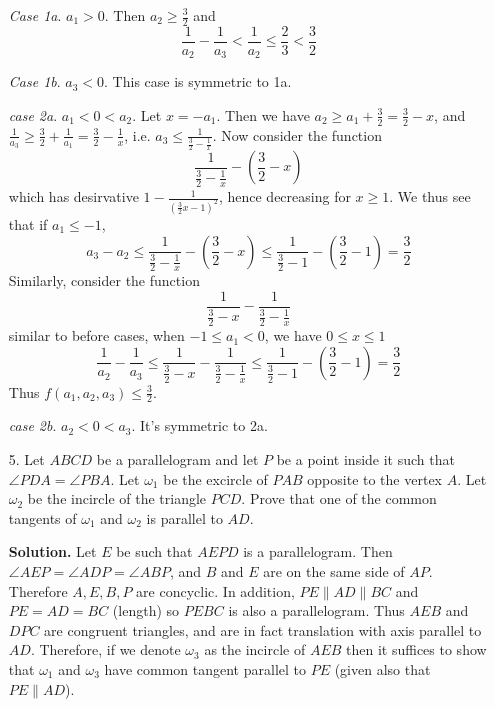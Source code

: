 \documentclass[11pt,a4paper]{article}
\begin{document}
\begin{enumerate}
	\emph{Case 1a}. $a_1> 0$. 
	Then $a_2\ge \frac 32$ and 
	\[
	\frac{1}{a_2}-\frac{1}{a_3}< \frac{1}{a_2} \le \frac{2}{3}<\frac 32
	\]
	
	\emph{Case 1b}. $a_3< 0$. 
	This case is symmetric to 1a. 
	
	\emph{case 2a}. $a_1<0<a_2$. 
	Let $x=-a_1$. 
	Then we have $a_2\ge a_1+\frac 32 = \frac 32 - x$, 
	and $\frac{1}{a_3}\ge \frac 32 +\frac{1}{a_1}=\frac 32-\frac 1x$, i.e. 
	$a_3\le \frac{1}{\frac 32-\frac 1x}$. 
	Now consider the function 
	\[
	\frac{1}{\frac 32-\frac 1x} - (\frac 32 - x)
	\]
	which has desirvative $1-\frac{1}{(\frac 32x-1)^2}$, hence decreasing for $x\ge 1$. 
	We thus see that if $a_1\le -1$, 
	\[
	a_3-a_2\le \frac{1}{\frac 32-\frac 1x} - (\frac 32 - x)\le 
	\frac{1}{\frac 32-1} - (\frac 32 - 1) = \frac 32
	\] 
	Similarly, consider the function 
	\[
	\frac{1}{\frac 32 - x} - \frac{1}{\frac 32- \frac{1}{x}}
	\]
	similar to before cases, when $-1\le a_1<0$, we have $0\le x\le 1$
	\[
	\frac{1}{a_2}-\frac{1}{a_3}
	\le \frac{1}{\frac 32 - x} - \frac{1}{\frac 32- \frac{1}{x}}
	\le \frac{1}{\frac 32-1} - (\frac 32 - 1) = \frac 32
	\]
	Thus $f(a_1, a_2, a_3)\le \frac 32$. 
	
	\emph{case 2b}. $a_2<0<a_3$. It's symmetric to 2a. 
	
	\item[5.]
	Let $ABCD$ be a parallelogram and let $P$ be a point inside it such that $\angle P DA = \angle P BA$.
	Let $\omega_1$ be the excircle of $P AB$ opposite to the vertex $A$. Let $\omega_2$ be the incircle of the
	triangle $PCD$. Prove that one of the common tangents of $\omega_1$ and $\omega_2$ is parallel to $AD$.
	
	\textbf{Solution.} 
	Let $E$ be such that $AEPD$ is a parallelogram. 
	Then $\angle AEP=\angle ADP=\angle ABP$, and $B$ and $E$ are on the same side of $AP$. 
	Therefore $A, E, B, P$ are concyclic. 
	In addition, $PE\parallel AD\parallel BC$ and $PE=AD=BC$ (length) so $PEBC$ is also a parallelogram. 
	Thus $AEB$ and $DPC$ are congruent triangles, 
	and are in fact translation with axis parallel to $AD$. 
	Therefore, if we denote $\omega_3$ as the incircle of $AEB$ then it suffices to show that $\omega_1$ and $\omega_3$ have common tangent parallel to $PE$ (given also that $PE\parallel AD$). 
	

\end{enumerate}
\end{document}
